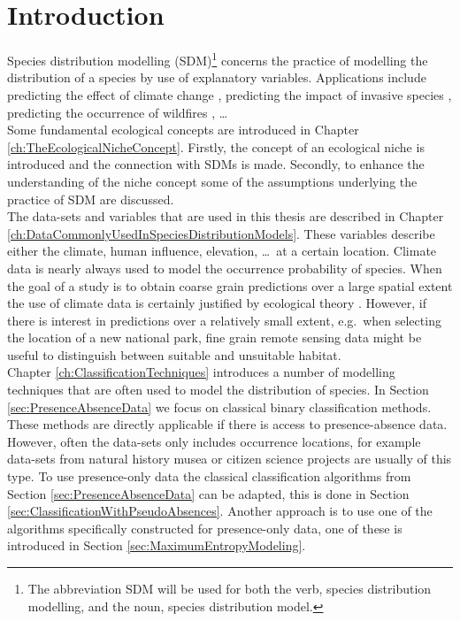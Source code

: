 \chapter{Introduction}
\label{ch:Introduction}
Species distribution modelling (SDM)\footnote{The abbreviation SDM will be used for both the verb, species distribution modelling, and the noun, species distribution model.} concerns the practice of modelling the distribution of a species by use of explanatory variables. Applications include predicting the effect of climate change \parencite{pearson_predicting_2003, pearson_modelling_2004}, predicting the impact of invasive species \parencite{strubbe_predicting_2008}, predicting the occurrence of wildfires \parencite{parisien_environmental_2009}, \ldots \\

Some fundamental ecological concepts are introduced in Chapter \ref{ch:TheEcologicalNicheConcept}. Firstly, the concept of an ecological niche is introduced and the connection with SDMs is made. Secondly, to enhance the understanding of the niche concept some of the assumptions underlying the practice of SDM are discussed. \\

The data-sets and variables that are used in this thesis are described in Chapter \ref{ch:DataCommonlyUsedInSpeciesDistributionModels}. These variables describe either the climate, human influence, elevation, \dots\ at a certain location. Climate data is nearly always used to model the occurrence probability of species. When the goal of a study is to obtain coarse grain predictions over a large spatial extent the use of climate data is certainly justified by ecological theory \parencite{pearson_predicting_2003}. However, if there is interest in predictions over a relatively small extent, e.g.\ when selecting the location of a new national park, fine grain remote sensing data might be useful to distinguish between suitable and unsuitable habitat. \\

Chapter \ref{ch:ClassificationTechniques} introduces a number of modelling techniques that are often used to model the distribution of species. In Section \ref{sec:PresenceAbsenceData} we focus on classical binary classification methods. These methods are directly applicable if there is access to presence-absence data. However, often the data-sets only includes occurrence locations, for example data-sets from natural history musea or citizen science projects are usually of this type. To use presence-only data the classical classification algorithms from Section \ref{sec:PresenceAbsenceData} can be adapted, this is done in Section \ref{sec:ClassificationWithPseudoAbsences}. Another approach is to use one of the algorithms specifically constructed for presence-only data, one of these is introduced in Section \ref{sec:MaximumEntropyModeling}. \\ 
 
